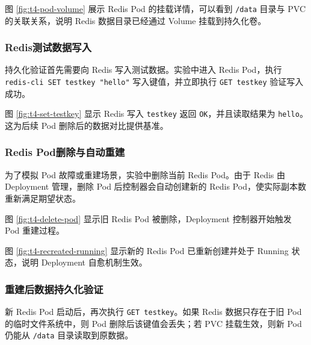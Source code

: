 
图 \ref{fig:t4-pod-volume} 展示 Redis Pod 的挂载详情，可以看到 \verb|/data| 目录与 PVC 的关联关系，说明 Redis 数据目录已经通过 Volume 挂载到持久化卷。

\subsubsection{Redis测试数据写入}

持久化验证首先需要向 Redis 写入测试数据。实验中进入 Redis Pod，执行 \verb|redis-cli SET testkey "hello"| 写入键值，并立即执行 \verb|GET testkey| 验证写入成功。


图 \ref{fig:t4-set-testkey} 显示 Redis 写入 \verb|testkey| 返回 \verb|OK|，并且读取结果为 \verb|hello|。这为后续 Pod 删除后的数据对比提供基准。

\subsubsection{Redis Pod删除与自动重建}

为了模拟 Pod 故障或重建场景，实验中删除当前 Redis Pod。由于 Redis 由 Deployment 管理，删除 Pod 后控制器会自动创建新的 Redis Pod，使实际副本数重新满足期望状态。


图 \ref{fig:t4-delete-pod} 显示旧 Redis Pod 被删除，Deployment 控制器开始触发 Pod 重建过程。


图 \ref{fig:t4-recreated-running} 显示新的 Redis Pod 已重新创建并处于 Running 状态，说明 Deployment 自愈机制生效。

\subsubsection{重建后数据持久化验证}

新 Redis Pod 启动后，再次执行 \verb|GET testkey|。如果 Redis 数据只存在于旧 Pod 的临时文件系统中，则 Pod 删除后该键值会丢失；若 PVC 挂载生效，则新 Pod 仍能从 \verb|/data| 目录读取到原数据。

